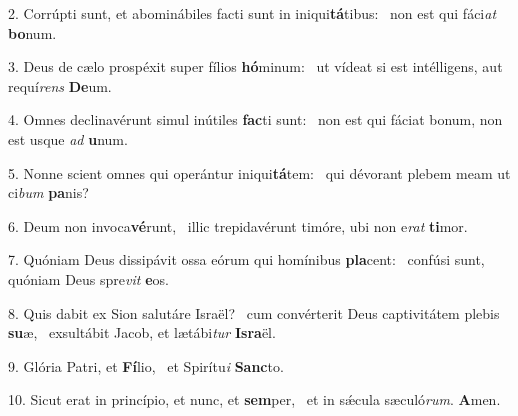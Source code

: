 2. Corrúpti sunt, et abominábiles facti sunt in iniqui\textbf{tá}tibus: \ast\  non est qui fáci\textit{at} \textbf{bo}num.\

3. Deus de cælo prospéxit super fílios \textbf{hó}minum: \ast\  ut vídeat si est intélligens, aut requí\textit{rens} \textbf{De}um.\

4. Omnes declinavérunt simul inútiles \textbf{fac}ti sunt: \ast\  non est qui fáciat bonum, non est usque \textit{ad} \textbf{u}num.\

5. Nonne scient omnes qui operántur iniqui\textbf{tá}tem: \ast\  qui dévorant plebem meam ut ci\textit{bum} \textbf{pa}nis?\

6. Deum non invoca\textbf{vé}runt, \ast\  illic trepidavérunt timóre, ubi non e\textit{rat} \textbf{ti}mor.\

7. Quóniam Deus dissipávit ossa eórum qui homínibus \textbf{pla}cent: \ast\  confúsi sunt, quóniam Deus spre\textit{vit} \textbf{e}os.\

8. Quis dabit ex Sion salutáre Israël? \dag\  cum convérterit Deus captivitátem plebis \textbf{su}æ, \ast\  exsultábit Jacob, et lætábi\textit{tur} \textbf{Is}\textbf{ra}ël.\

9. Glória Patri, et \textbf{Fí}lio, \ast\  et Spirítu\textit{i} \textbf{Sanc}to.\

10. Sicut erat in princípio, et nunc, et \textbf{sem}per, \ast\  et in sǽcula sæculó\textit{rum}. \textbf{A}men.\


